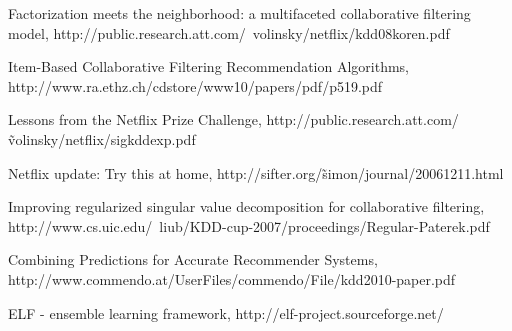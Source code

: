 \documentclass[journal]{IEEEtran}
\begin{document}
%
%
%
\begin{thebibliography}{1}

Factorization meets the neighborhood: a multifaceted collaborative filtering model, http://public.research.att.com/~volinsky/netflix/kdd08koren.pdf

Item-Based Collaborative Filtering Recommendation Algorithms, http://www.ra.ethz.ch/cdstore/www10/papers/pdf/p519.pdf

Lessons from the Netflix Prize Challenge, http://public.research.att.com/\~volinsky/netflix/sigkddexp.pdf

Netflix update: Try this at home, http://sifter.org/\~simon/journal/20061211.html

Improving regularized singular value decomposition for collaborative filtering, http://www.cs.uic.edu/~liub/KDD-cup-2007/proceedings/Regular-Paterek.pdf

Combining Predictions for Accurate Recommender Systems, http://www.commendo.at/UserFiles/commendo/File/kdd2010-paper.pdf


ELF - ensemble learning framework, http://elf-project.sourceforge.net/

\end{thebibliography}

% 
\end{document}
